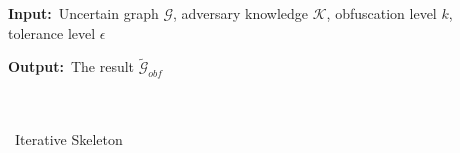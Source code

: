 \begin{algorithm}
	\begin{algorithmic}[1]
    	\item[] {\textbf{Input:}~Uncertain graph $\mathcal{G}$, adversary knowledge $\mathcal{K}$, obfuscation level $k$, tolerance level $\epsilon$}
        \item[] {\textbf{Output:}~The result $\tilde{\mathcal{G}}_{obf}$}
     	 \\
        \REPEAT
         \\
         \\
        \REPEAT
    	\caption{\methodName~Iterative Skeleton}
	 \label{alg:Skeleton}
    \end{algorithmic}
\end{algorithm}
\vspace{-5pt}

